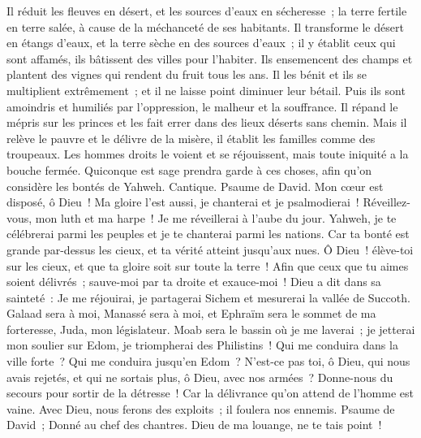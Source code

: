 \begin{multicols}{2}
Il réduit les fleuves en désert, et les sources d'eaux en sécheresse~;
la terre fertile en terre salée, à cause de la méchanceté de ses habitants.
Il transforme le désert en étangs d'eaux, et la terre sèche en des sources d'eaux~;
il y établit ceux qui sont affamés, ils bâtissent des villes pour l'habiter.
Ils ensemencent des champs et plantent des vignes qui rendent du fruit tous les ans.
Il les bénit et ils se multiplient extrêmement~; et il ne laisse point diminuer leur bétail.
Puis ils sont amoindris et humiliés par l'oppression, le malheur et la souffrance.
Il répand le mépris sur les princes et les fait errer dans des lieux déserts sans chemin.
Mais il relève le pauvre et le délivre de la misère, il établit les familles comme des troupeaux.
Les hommes droits le voient et se réjouissent, mais toute iniquité a la bouche fermée.
Quiconque est sage prendra garde à ces choses, afin qu'on considère les bontés de Yahweh.
\VerseOne{}Cantique. Psaume de David. Mon cœur est disposé, ô Dieu~! Ma gloire l'est aussi, je chanterai et je psalmodierai~!
Réveillez-vous, mon luth et ma harpe~! Je me réveillerai à l'aube du jour.
Yahweh, je te célébrerai parmi les peuples et je te chanterai parmi les nations.
Car ta bonté est grande par-dessus les cieux, et ta vérité atteint jusqu'aux nues.
Ô Dieu~! élève-toi sur les cieux, et que ta gloire soit sur toute la terre~!
Afin que ceux que tu aimes soient délivrés~; sauve-moi par ta droite et exauce-moi~!
Dieu a dit dans sa sainteté~: Je me réjouirai, je partagerai Sichem et mesurerai la vallée de Succoth.
Galaad sera à moi, Manassé sera à moi, et Ephraïm sera le sommet de ma forteresse, Juda, mon législateur.
Moab sera le bassin où je me laverai~; je jetterai mon soulier sur Edom, je triompherai des Philistins~!
Qui me conduira dans la ville forte~? Qui me conduira jusqu'en Edom~?
N'est-ce pas toi, ô Dieu, qui nous avais rejetés, et qui ne sortais plus, ô Dieu, avec nos armées~?
Donne-nous du secours pour sortir de la détresse~! Car la délivrance qu'on attend de l'homme est vaine.
Avec Dieu, nous ferons des exploits~; il foulera nos ennemis.
\VerseOne{}Psaume de David~; Donné au chef des chantres. Dieu de ma louange, ne te tais point~!

\end{multicols}
